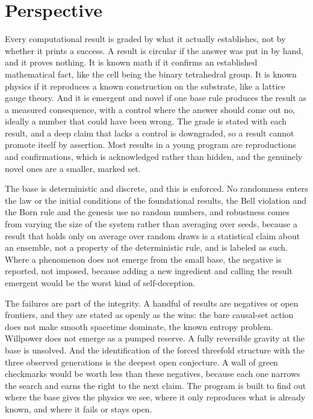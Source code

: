 \section{Perspective}

Every computational result is graded by what it actually establishes, not by whether it prints a success. A result is
circular if the answer was put in by hand, and it proves nothing. It is known math if it confirms an established
mathematical fact, like the cell being the binary tetrahedral group. It is known physics if it reproduces a known
construction on the substrate, like a lattice gauge theory. And it is emergent and novel if one base rule produces the
result as a measured consequence, with a control where the answer should come out no, ideally a number that could have
been wrong. The grade is stated with each result, and a deep claim that lacks a control is downgraded, so a result cannot
promote itself by assertion. Most results in a young program are reproductions and confirmations, which is acknowledged
rather than hidden, and the genuinely novel ones are a smaller, marked set.

The base is deterministic and discrete, and this is enforced. No randomness enters the law or the initial conditions of
the foundational results, the Bell violation and the Born rule and the genesis use no random numbers, and robustness
comes from varying the size of the system rather than averaging over seeds, because a result that holds only on average
over random draws is a statistical claim about an ensemble, not a property of the deterministic rule, and is labeled as
such. Where a phenomenon does not emerge from the small base, the negative is reported, not imposed, because
adding a new ingredient and calling the result emergent would be the worst kind of self-deception.

The failures are part of the integrity. A handful of results are negatives or open frontiers, and they are stated
as openly as the wins: the bare causal-set action does not make smooth spacetime dominate, the known entropy problem.
Willpower does not emerge as a pumped reserve. A fully reversible gravity at the base is unsolved. And the identification
of the forced threefold structure with the three observed generations is the deepest open conjecture. A wall of green
checkmarks would be worth less than these negatives, because each one narrows the search and earns the right to the
next claim. The program is built to find out where the base gives the physics we
see, where it only reproduces what is already known, and where it fails or stays open.
